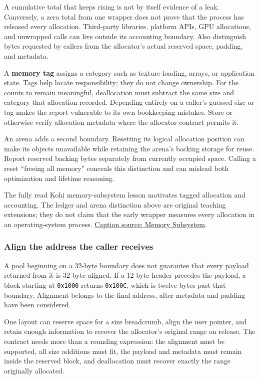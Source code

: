 A cumulative total that keeps rising is not by itself evidence of a leak. Conversely, a zero total from one wrapper does not prove that the process has released every allocation. Third-party libraries, platform APIs, GPU allocations, and unwrapped calls can live outside its accounting boundary. Also distinguish bytes requested by callers from the allocator's actual reserved space, padding, and metadata.

A \textbf{memory tag} assigns a category such as texture loading, arrays, or application state. Tags help locate responsibility; they do not change ownership. For the counts to remain meaningful, deallocation must subtract the same size and category that allocation recorded. Depending entirely on a caller's guessed size or tag makes the report vulnerable to its own bookkeeping mistakes. Store or otherwise verify allocation metadata where the allocator contract permits it.

An arena adds a second boundary. Resetting its logical allocation position can make its objects unavailable while retaining the arena's backing storage for reuse. Report reserved backing bytes separately from currently occupied space. Calling a reset ``freeing all memory'' conceals this distinction and can mislead both optimization and lifetime reasoning.

The fully read Kohi memory-subsystem lesson motivates tagged allocation and accounting. The ledger and arena distinction above are original teaching extensions; they do not claim that the early wrapper measures every allocation in an operating-system process. \href{https://www.youtube.com/watch?v=_GBUCo2FbUk}{Caption source: Memory Subsystem}.

\subsubsection{Align the address the caller receives}\label{05-engine-i-ch014-align-the-address-the-caller-receives}

A pool beginning on a 32-byte boundary does not guarantee that every payload returned from it is 32-byte aligned. If a 12-byte header precedes the payload, a block starting at \texttt{0x1000} returns \texttt{0x100C}, which is twelve bytes past that boundary. Alignment belongs to the final address, after metadata and padding have been considered.

One layout can reserve space for a size breadcrumb, align the user pointer, and retain enough information to recover the allocator's original range on release. The contract needs more than a rounding expression: the alignment must be supported, all size additions must fit, the payload and metadata must remain inside the reserved block, and deallocation must recover exactly the range originally allocated.

